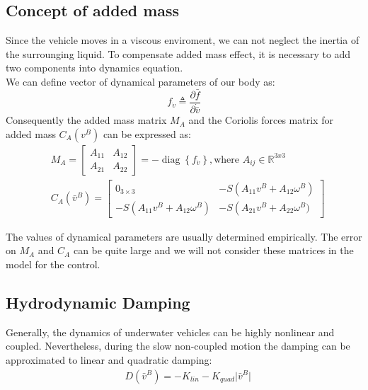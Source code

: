 \subsection{Concept of added mass}

    Since the vehicle moves in a viscous enviroment, we can not neglect the inertia of the surrounging liquid.
    To compensate added mass effect, it is necessary to add two components into dynamics equation.\\
    We can define vector of dynamical parameters of our body as:
    $$
    f_{\dot{v}} \triangleq \frac{\partial \bar{f}}{\partial \dot{\bar{v}}}
    $$
    Consequently the added mass matrix $M_A$ and 
    the Coriolis forces matrix for added mass $C_A(v^B)$
    can be expressed as: 
    $$
    \begin{aligned}
        & M_A=\left[\begin{array}{cc}
            A_{11} & A_{12} \\
            A_{21} & A_{22}
            \end{array}\right]=-\operatorname{diag}\left\{f_{\dot{v}}\right\}, \textrm{where } A_{ij} \in \mathbb{R}^{3 x 3} \\
        & C_A(\bar{v}^B)=\left[\begin{array}{cc}
        0_{3 \times 3} & -S\left(A_{11} v^B+A_{12} \omega^B\right) \\
        -S\left(A_{11} v^B+A_{12} \omega^B\right) & -S\left(A_{21} v^B+A_{22} \omega^B)\right.
        \end{array}\right]
    \end{aligned}
    $$

    The values of dynamical parameters are usually determined
    empirically. The error on $M_A$ and $C_A$ can be quite large and we will not consider
    these matrices in the model for the control.

\subsection{Hydrodynamic Damping}

    Generally, the dynamics of underwater vehicles can be highly nonlinear and coupled.
    Nevertheless, during the slow non-coupled motion the damping can be approximated to linear and quadratic damping:
    $$\begin{aligned}
        & D(\bar{v}^B)=-K_{lin} - K_{quad}\lvert \bar{v}^B \rvert
    \end{aligned}
    $$

